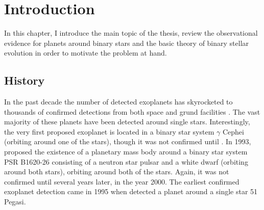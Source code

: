 \documentclass[ twoside,openright,titlepage,numbers=noenddot,headinclude,%
                footinclude=true,cleardoublepage=empty,abstractoff, %
                BCOR=5mm,paper=a4,fontsize=11pt,%
                american,%
                ]{scrreprt}
\begin{document}
\frenchspacing
\raggedbottom
{} %
\pagestyle{plain}
%

%


\pagestyle{scrheadings}

\cleardoublepage{}
\chapter{Introduction}\label{ch:introduction}
In this chapter, I introduce the main topic of the thesis, review the 
observational evidence for planets around binary stars and the 
basic theory of binary stellar evolution in order to motivate the problem
at hand.

\section{History}
\label{sec:History}
In the past decade the number of detected exoplanets has skyrocketed
 to thousands of confirmed detections from both space and grund facilities 
 \citep{fabrycky2015}. The vast majority
 of these planets have been detected around single stars. Interestingly, 
 the very first proposed exoplanet \citep{campbell1988} is located in a 
 binary star system $\gamma$ Cephei (orbiting around one of the stars), 
 though it was not confirmed until \cite{hatzes2003}. In 1993, 
 \cite{thorsett1993} proposed the existence of a planetary mass body around
 a binary star system PSR B1620-26 consisting of a neutron star 
 pulsar and a white dwarf (orbiting around both stars),
 orbiting around both of the stars. Again, it was not confirmed until several
 years later, in the year 2000. The earliest confirmed exoplanet detection 
 came in 1995 when \cite{mayor1995} detected a planet around a single star
 51 Pegasi.  
\end{document}

